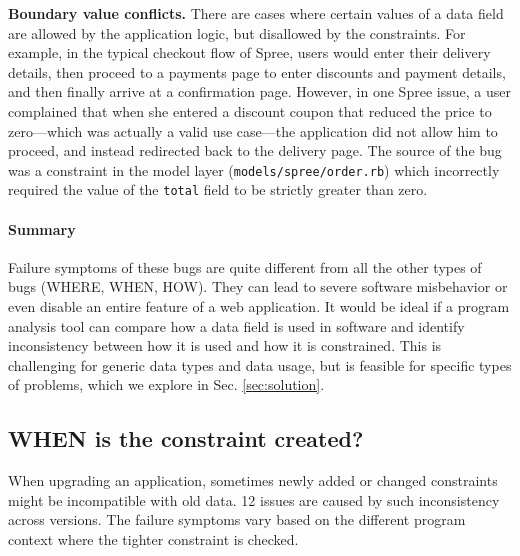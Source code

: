 \textbf{Boundary value conflicts.} There are cases where certain
values of a data field are allowed by the application logic, 
but disallowed by the constraints. For example, in the typical checkout flow of Spree, users would enter their delivery details, then proceed to a payments page to enter discounts and payment details, and then finally arrive at a confirmation page. However, in one Spree issue\cite{spree-6673}, a user complained that when she entered a discount coupon that reduced the price to zero---which was actually a valid use case---the application did not allow him to proceed, and instead redirected back to the delivery page. The source of the bug was a constraint in the model layer ({\tt models/spree/order.rb}) which
incorrectly required the value of the {\tt total} field to be strictly greater than zero.

\paragraph{\bf Summary}
Failure symptoms of these bugs are quite different from all the other types 
of bugs (WHERE, WHEN, HOW). They can lead to severe software misbehavior or even
disable an entire feature of a web application.  
It would be ideal if a program analysis tool can compare how a data field
is used in software and identify inconsistency between how it is used and 
how it is constrained. This is challenging for generic data
types and data usage, but is feasible for specific types of 
problems, which we explore
in Sec. \ref{sec:solution}.


\subsection{WHEN is the constraint created?}
\label{subsec:when}

When upgrading an application, sometimes newly added or changed constraints might be incompatible with old data. 
12 issues are caused by such inconsistency across versions. 
The failure symptoms vary based on the different program context where the 
tighter constraint is checked.


